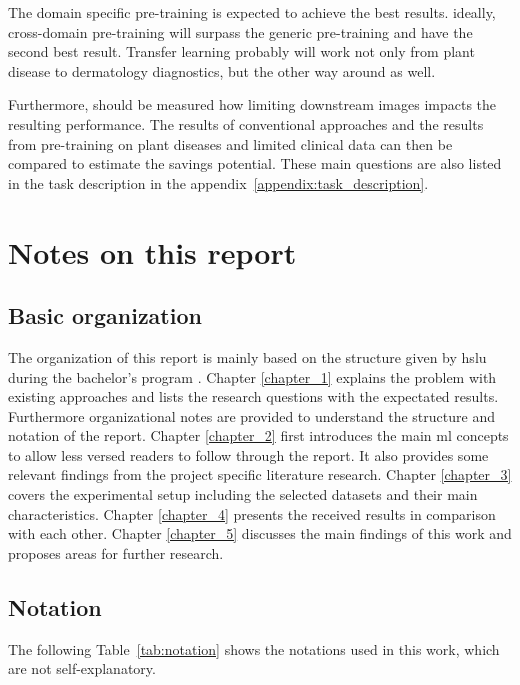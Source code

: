 The domain specific pre-training is expected to achieve the best results.
ideally, cross-domain pre-training will surpass the generic pre-training and have the second best result.
Transfer learning probably will work not only from plant disease to dermatology diagnostics, but the other way around as well.


Furthermore, should be measured how limiting downstream images impacts the resulting performance. 
The results of conventional approaches and the results from pre-training on plant diseases and limited clinical data can then be compared to estimate the savings potential.
These main questions are also listed in the task description in the appendix~\ref{appendix:task_description}.

\section{Notes on this report}
\subsection{Basic organization}
The organization of this report is mainly based on the structure given by \gls{hslu} during the bachelor's program \autocite{balzert2011}.
Chapter \ref{chapter_1} explains the problem with existing approaches and lists the research questions with the expectated results. 
Furthermore organizational notes are provided to understand the structure and notation of the report.
Chapter \ref{chapter_2} first introduces the main \gls{ml} concepts to allow less versed readers to follow through the report.
It also provides some relevant findings from the project specific literature research.
Chapter \ref{chapter_3} covers the experimental setup including the selected datasets and their main characteristics.
Chapter \ref{chapter_4} presents the received results in comparison with each other.
Chapter \ref{chapter_5} discusses the main findings of this work and proposes areas for further research. 

\subsection{Notation}

The following Table~\ref{tab:notation} shows the notations used in this work, which are not self-explanatory.

